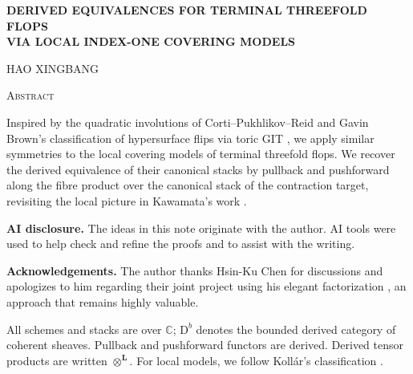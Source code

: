 \documentclass[a4paper,10pt]{article}
\newcommand{\Db}{\mathrm{D}^b}
\theoremstyle{remark}
\theoremstyle{plain}
\begin{document}
\begin{center}
\fontsize{13pt}{10pt}\selectfont
\textsc{\textbf{DERIVED EQUIVALENCES FOR TERMINAL THREEFOLD FLOPS\\[3pt]
VIA LOCAL INDEX-ONE COVERING MODELS}}
\end{center}
\vspace{0.1cm}
\begin{center}
\fontsize{10pt}{8pt}\selectfont
\textsc{HAO XINGBANG}
\end{center}
\vspace{0.2cm}
\begin{center}
\fontsize{12pt}{10pt}\selectfont
\textsc{Abstract}
\end{center}
\noindent
Inspired by the quadratic involutions of Corti--Pukhlikov--Reid
\cite{CPR} and Gavin Brown's classification of hypersurface flips via
toric GIT \cite{Brown}, we apply similar symmetries to the local covering
models of terminal threefold flops. We recover the derived equivalence
of their canonical stacks by pullback and pushforward along the fibre
product over the canonical stack of the contraction target, revisiting
the local picture in Kawamata's work \cite{Kawamata}.

\medskip
\noindent\textbf{AI disclosure.}
The ideas in this note originate with the author. AI tools were used
to help check and refine the proofs and to assist with the writing.

\smallskip
\noindent\textbf{Acknowledgements.}
The author thanks Hsin-Ku Chen for discussions and apologizes to him regarding their
joint project using his elegant factorization \cite{HKChen}, an approach that remains
highly valuable.

\medskip
All schemes and stacks are over $\mathds{C}$; $\Db$ denotes the bounded derived
category of coherent sheaves. Pullback and pushforward functors are
derived. Derived tensor products
are written $\otimes^{\mathbf L}$.
For local models, we follow Koll\'ar's classification \cite{KollarSurvey}.
\end{document}
